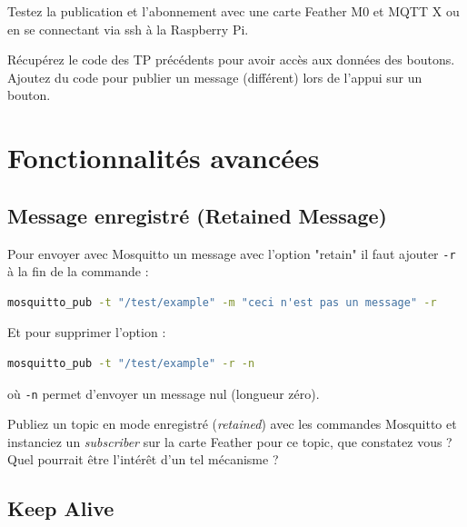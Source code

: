 \documentclass[11pt]{paper}
\newcommand\rasp{Raspberry Pi\xspace}
\newcommand\sub{{\it subscriber}\xspace}
\begin{document}
Testez la publication et l'abonnement avec une carte Feather M0 et MQTT X ou en se connectant via ssh à la \rasp.

Récupérez le code des TP précédents pour avoir accès aux données des boutons. Ajoutez du code pour publier un message (différent) lors de l'appui sur un bouton.\\


\section{Fonctionnalités avancées}

\subsection{Message enregistré (Retained Message)}

Pour envoyer avec Mosquitto un message avec l'option "retain" il faut ajouter {\tt -r} à la fin de la commande :
\begin{lstlisting}[language=bash]
mosquitto_pub -t "/test/example" -m "ceci n'est pas un message" -r
 \end{lstlisting}
 
 Et pour supprimer l'option :
\begin{lstlisting}[language=bash] 
mosquitto_pub -t "/test/example" -r -n
 \end{lstlisting}
où {\tt -n} permet d'envoyer un message nul (longueur zéro).

Publiez un topic en mode enregistré ({\it retained}) avec les commandes Mosquitto et instanciez un \sub sur la carte Feather pour ce topic, que constatez vous ? Quel pourrait être l’intérêt d’un tel mécanisme ?\\


\subsection{Keep Alive}
\end{document}
